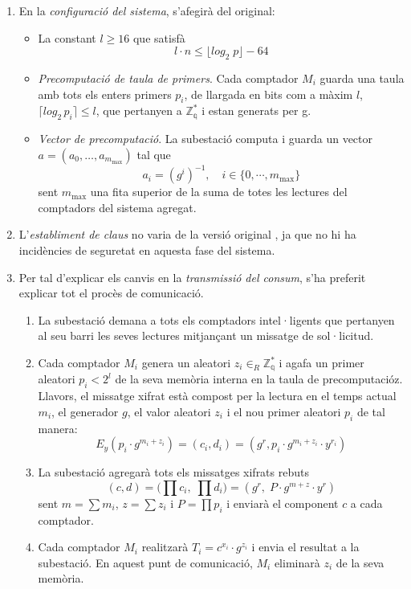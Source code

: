 \begin{enumerate}
	\item En la \textit{configuració del sistema}, s'afegirà del original:
	\begin{itemize}
		\item La constant $l \ge 16 $ que satisfà \[l \cdot n \le \lfloor log_2 \; p \rfloor - 64\]
		\item \textit{Precomputació de taula de primers}. Cada comptador $M_i$ guarda una taula amb tots els enters primers $p_i$, de llargada en bits com a màxim $l$, $\lceil log_2 \, p_i \rceil \le l$, que pertanyen a $\mathbb{Z_q^*}$ i estan generats per g.
		\item \textit{Vector de precomputació}. La subestació computa i guarda un vector $a = (a_0, \dots, a_{m_{\textrm{max}}})$ tal que \[a_i = (g^i)^{-1}, \quad i \in \{0, \cdots, m_{\textrm{max}}\}\] sent $m_{\textrm{max}}$ una fita superior de la suma de totes les lectures del comptadors del sistema agregat.
	\end{itemize}
	\item L'\textit{establiment de claus} no varia de la versió original \cite{busom}, ja que no hi ha incidències de seguretat en aquesta fase del sistema.
	\item Per tal d'explicar els canvis en la \textit{transmissió del consum}, s'ha preferit explicar tot el procès de comunicació.
	\begin{enumerate}
		\item La subestació demana a tots els comptadors intel·ligents que pertanyen al seu barri les seves lectures mitjançant un missatge de sol·licitud.
		\item Cada comptador $M_i$ genera un aleatori $z_i \in_R \mathbb{Z_q^*}$ i agafa un primer aleatori $p_i < 2^l$ de la seva memòria interna en la taula de precomputacióz. Llavors, el missatge xifrat està compost per la lectura en el temps actual $m_i$, el generador $g$, el valor aleatori $z_i$ i el nou primer aleatori $p_i$ de tal manera:
		\[E_y(p_i \cdot g^{m_i + z_i}) = (c_i, d_i) = (g^r, p_i \cdot g^{m_i + z_i} \cdot y^{r_i})\]
		\item La subestació agregarà tots els missatges xifrats rebuts
		\[(c, d) = \Big( \prod c_i, \; \prod d_i \Big) = (g^r,\; P \cdot g^{m + z} \cdot y^r)\]
		sent $m = \sum m_i$, $z = \sum z_i$ i $P = \prod p_i$ i enviarà el component $c$ a cada comptador.
		\item Cada comptador $M_i$ realitzarà $T_i = c^{x_i} \cdot g^{z_i}$ i envia el resultat a la subestació. En aquest punt de comunicació, $M_i$ eliminarà $z_i$ de la seva memòria.

\end{enumerate}
\end{enumerate}
